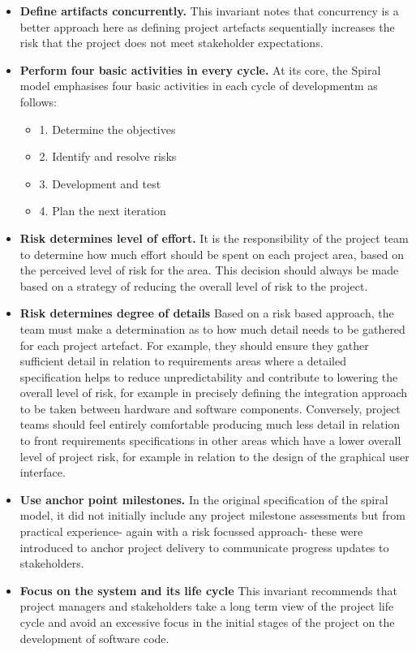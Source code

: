 \documentclass[a4paper,12pt]{article}
\begin{document}
\begin{samepage}
\begin{samepage}
\begin{itemize}
\item \textbf{Define artifacts concurrently.} This invariant notes that concurrency is a better approach here as defining project artefacts sequentially increases the risk that the project does not meet stakeholder expectations.
\newpage
\item \textbf{Perform four basic activities in every cycle.}
At its core, the Spiral model emphasises four basic activities in each cycle of developmentm as follows:
\begin{itemize}
\item 1. Determine the objectives
\item 2. Identify and resolve risks 
\item 3. Development and test
\item 4. Plan the next iteration
\end{itemize}
\item \textbf {Risk determines level of effort.} It is the responsibility of the project team to determine how much effort should be spent on each project area, based on the perceived level of risk for the area. This decision should always be made based on a strategy of reducing the overall level of risk to the project.
\item \textbf {Risk determines degree of details} Based on a risk based approach, the team must make a determination as to how much detail needs to be gathered for each project artefact. For example, they should ensure they gather sufficient detail in relation to requirements areas where a detailed specification helps to reduce unpredictability and contribute to lowering the overall level of risk, for example in precisely defining the integration approach to be taken between hardware and software components. Conversely, project teams should feel entirely comfortable producing much less detail in relation to front requirements specifications in other areas which have a lower overall level of project risk, for example in relation to the design of the graphical user interface.
\item \textbf {Use anchor point milestones.} In the original specification of the spiral model, it did not initially include any project milestone assessments but from practical experience- again with a risk focussed approach- these were introduced to anchor project delivery to communicate progress updates to stakeholders.

\item \textbf {Focus on the system and its life cycle}
This invariant recommends that project managers and stakeholders take a long term view of the project life cycle and avoid an excessive focus in the initial stages of the project on the development of software code.
\end{itemize}
\newpage

\end{samepage}
\end{samepage}
\end{document}

